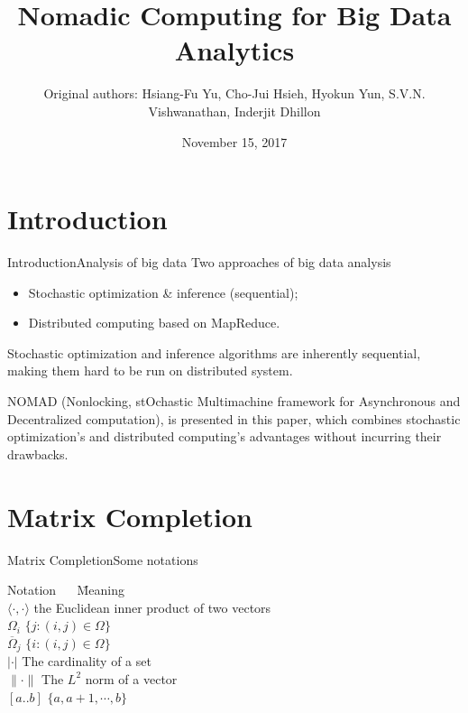 \documentclass{beamer}
\title[Nomadic Computing for Big Data Analytics]{Nomadic Computing for Big Data Analytics}
\institute{}
\author[Delivered by Chen Shaoyuan]{Original authors: Hsiang-Fu Yu, Cho-Jui Hsieh, Hyokun Yun, S.V.N. Vishwanathan, Inderjit Dhillon}
\date{November 15, 2017}
\begin{document}
  \begin{frame}
    \titlepage
  \end{frame}

  \section{Introduction}
  \begin{frame}{Introduction}{Analysis of big data}
    Two approaches of big data analysis
    \begin{itemize}
      \item Stochastic optimization \& inference (sequential);
      \item Distributed computing based on MapReduce.
    \end{itemize}
    \pause
    Stochastic optimization and inference algorithms are inherently sequential, making them hard to be run on distributed system. \par
    \pause
    NOMAD (Nonlocking, stOchastic Multimachine framework for Asynchronous and Decentralized computation), is presented in this paper, which combines stochastic optimization's and distributed computing's advantages without incurring their drawbacks.
  \end{frame}

  \section{Matrix Completion}
  \begin{frame}{Matrix Completion}{Some notations}
    \begin{tabbing}
      Notation $\quad$ \=  Meaning \\
      $\langle \cdot , \cdot \rangle$ \> the Euclidean inner product of two vectors \\
      $\Omega_i$ \> $\{j : (i, j) \in \Omega\}$ \\
      $\overline{\Omega}_j$ \> $\{i : (i, j) \in \Omega\}$ \\
      $|\cdot|$ \> The cardinality of a set \\
      $\| \cdot \|$ \> The $L^2$ norm of a vector \\
      $[a..b]$ \> $\{a, a+1, \cdots, b\}$
    \end{tabbing}
  \end{frame}
\end{document}
